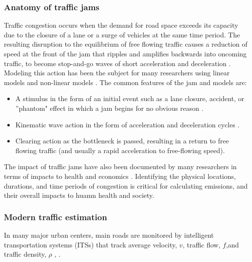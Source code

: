 \subsubsection{Anatomy of traffic jams}
Traffic congestion occurs when the demand for road space exceeds its capacity due to the closure of a lane or a surge of vehicles at the same time period. The resulting disruption to the equilibrium of free flowing traffic causes a reduction of speed at the front of the jam that ripples and amplifies backwards into oncoming traffic, to become stop-and-go waves of short acceleration and deceleration \citep{Orosz2010}. Modeling this action has been the subject for many researchers using linear models \citep{Lighthill1955,Treiber2000} and non-linear models \citep{Li2005}. The common features of the jam and models are:

\begin{itemize}
\item{A stimulus in the form of an initial event such as a lane closure, accident, or ''phantom" effect in which a jam begins for no obvious reason \citep{Flynn2008}.}
\item{Kinematic wave action in the form of acceleration and deceleration cycles \citep{Lighthill1955}.}
\item{Clearing action as the bottleneck is passed, resulting in a return to free flowing traffic (and usually a rapid acceleration to free-flowing speed).}
\end{itemize}

The impact of traffic jams have also been documented by many researchers in terms of impacts to health \citep{Zhang2013, Zhang2011, Levy2010} and economics \citep{Cebr2014}.  Identifying the physical locations, durations, and time periods of congestion is critical for calculating emissions, and their overall impacts to huamn health and society.

\subsubsection{Modern traffic estimation}

In many major urban centers, main roads are monitored by intelligent transportation systems (ITSs) that track average velocity, $v$, traffic flow, $f$,and traffic density, $\rho$ \cite{Wu2007}, \cite{Bartosz2015}.

